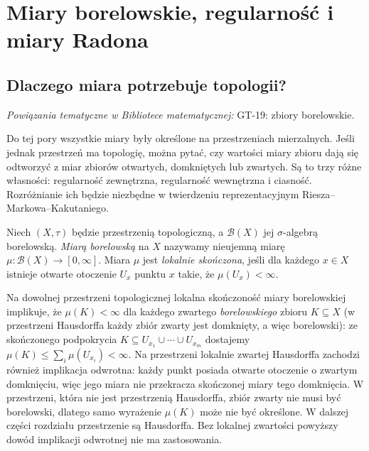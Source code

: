 \chapter{Miary borelowskie, regularność i miary Radona}
\label{ch:radon-measures-20}

\providecommand{\atlasref}[2]{#2}


\section{Dlaczego miara potrzebuje topologii?}

\noindent\emph{Powiązania tematyczne w Bibliotece matematycznej:} \atlasref{GT-19::def:topog-polskie-borel}{GT-19: zbiory borelowskie}.

Do tej pory wszystkie miary były określone na przestrzeniach
mierzalnych. Jeśli jednak przestrzeń ma topologię, można pytać,
czy wartości miary zbioru dają się odtworzyć z miar zbiorów
otwartych, domkniętych lub zwartych. Są to trzy różne własności:
regularność zewnętrzna, regularność wewnętrzna i ciasność.
Rozróżnianie ich będzie niezbędne w twierdzeniu reprezentacyjnym
Riesza--Markowa--Kakutaniego.

\begin{definicja}
\label{def:borel-locfinite-20}
Niech $(X,\tau)$ będzie przestrzenią topologiczną,
a $\mathcal B(X)$ jej $\sigma$-algebrą borelowską.
\emph{Miarą borelowską} na $X$ nazywamy nieujemną miarę
$\mu:\mathcal B(X)\to[0,\infty]$.
Miara $\mu$ jest \emph{lokalnie skończona}, jeśli dla
każdego $x\in X$ istnieje otwarte otoczenie $U_x$ punktu $x$
takie, że $\mu(U_x)<\infty$.
\end{definicja}

\begin{uwaga}
\label{rem:compact-finiteness-20}
Na dowolnej przestrzeni topologicznej lokalna skończoność miary borelowskiej
implikuje, że $\mu(K)<\infty$ dla każdego zwartego
\emph{borelowskiego} zbioru $K\subseteq X$ (w przestrzeni Hausdorffa każdy zbiór zwarty jest domknięty, a więc borelowski): ze skończonego podpokrycia
$K\subseteq U_{x_1}\cup\cdots\cup U_{x_m}$ dostajemy
$\mu(K)\le\sum_i\mu(U_{x_i})<\infty$.
Na przestrzeni lokalnie zwartej Hausdorffa zachodzi
również implikacja odwrotna: każdy punkt posiada otwarte
otoczenie o zwartym domknięciu, więc jego miara nie
przekracza skończonej miary tego domknięcia.
W przestrzeni, która nie jest przestrzenią Hausdorffa, zbiór zwarty nie musi być borelowski, dlatego samo wyrażenie $\mu(K)$ może nie być określone. W dalszej części rozdziału przestrzenie są Hausdorffa. Bez lokalnej zwartości powyższy dowód implikacji odwrotnej nie ma zastosowania.
\end{uwaga}

